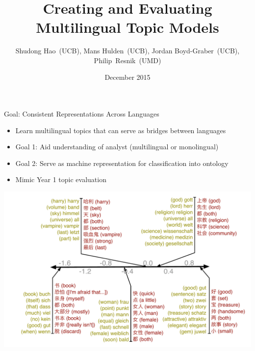 \documentclass[compress]{beamer}
\title[ITM]{Creating and Evaluating Multilingual Topic Models}
\author[Boyd-Graber]{Shudong Hao~(UCB), Mans Hulden~(UCB), Jordan Boyd-Graber~(UCB), Philip~Resnik~(UMD)}
\date{December 2015}
\institute[Boulder] %
{University of Maryland and University of Colorado Boulder}
\begin{document}
\maketitle


\begin{frame}{Goal: Consistent Representations Across Languages}
  \begin{itemize}
    \item Learn multilingual topics that can serve as
      bridges between languages
    \item Goal 1: Aid understanding of analyst (multilingual or
      monolingual)
    \item Goal 2: Serve as machine representation for classification
      into ontology
      \item Mimic Year 1 topic evaluation
  \end{itemize}

  \begin{center}
    \includegraphics[width=.6\linewidth]{mlslda/chinese_amazon_dict}
  \end{center}

\end{frame}
\end{document}
